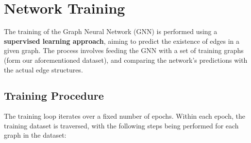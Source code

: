 \documentclass[11pt]{article}
\begin{document}
	\section{Network Training}
	The training of the Graph Neural Network (GNN) is performed using a \textbf{supervised learning approach}, aiming to predict the existence of edges in a given graph. The process involves feeding the GNN with a set of training graphs (form our aforementioned dataset), and comparing the network's predictions with the actual edge structures.
	
	\subsection{Training Procedure}
	The training loop iterates over a fixed number of epochs. Within each epoch, the training dataset is traversed, with the following steps being performed for each graph in the dataset:
\end{document}
